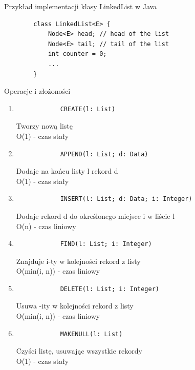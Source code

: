 \documentclass[12pt]{article}
\begin{document}
        Przykład implementacji klasy LinkedList w Java
        \begin{verbatim}
        class LinkedList<E> {
            Node<E> head; // head of the list
            Node<E> tail; // tail of the list
            int counter = 0;
            ...
        }
    \end{verbatim}

    Operacje i złożoności

    \begin{enumerate}
        \item
        \begin{verbatim}
            CREATE(l: List)
        \end{verbatim}
        Tworzy nową listę \\
        O(1) - czas stały
        \item
        \begin{verbatim}
            APPEND(l: List; d: Data)
        \end{verbatim}
        Dodaje na końcu listy l rekord d \\
        O(1) - czas stały
        \item
        \begin{verbatim}
            INSERT(l: List; d: Data; i: Integer)
        \end{verbatim}
        Dodaje rekord d do określonego miejsce i w liście l \\
        O(n) - czas liniowy
        \item
        \begin{verbatim}
            FIND(l: List; i: Integer)
        \end{verbatim}
        Znajduje i-ty w kolejności rekord z listy \\
        O(min(i, n)) - czas liniowy
        \item
        \begin{verbatim}
            DELETE(l: List; i: Integer)
        \end{verbatim}
        Usuwa -ity w kolejności rekord z listy \\
        O(min(i, n)) - czas liniowy
        \item
        \begin{verbatim}
            MAKENULL(l: List)
        \end{verbatim}
        Czyści listę, usuwając wszystkie rekordy \\
        O(1) - czas stały
    \end{enumerate}
    \newpage
\end{document}
